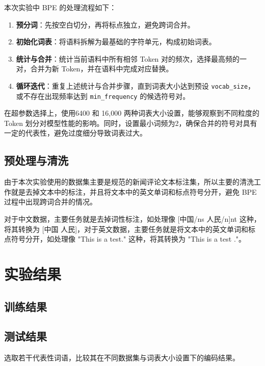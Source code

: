 \documentclass[a4paper,12pt]{ctexart} %
\begin{document}
本次实验中 BPE 的处理流程如下：
\begin{enumerate}
    \item \textbf{预分词}：先按空白切分，再将标点独立，避免跨词合并。
    \item \textbf{初始化词表}：将语料拆解为最基础的字符单元，构成初始词表。
    \item \textbf{统计与合并}：统计当前语料中所有相邻 Token 对的频次，选择最高频的一对，合并为新 Token，并在语料中完成对应替换。
    \item \textbf{循环迭代}：重复上述统计与合并步骤，直到词表大小达到预设 \texttt{vocab\_size}，或不存在出现频率达到 \texttt{min\_frequency} 的候选符号对。
\end{enumerate}
在超参数选择上，使用6400 和 16,000 两种词表大小设置，能够观察到不同粒度的 Token 划分对模型性能的影响。同时，设置最小词频为2，确保合并的符号对具有一定的代表性，避免过度细分导致词表过大。
\subsection{预处理与清洗}
由于本次实验使用的数据集主要是规范的新闻评论文本标注集，所以主要的清洗工作就是去掉文本中的标注，并且将文本中的英文单词和标点符号分开，避免 BPE 过程中出现跨词合并的情况。


对于中文数据，主要任务就是去掉词性标注，如处理像 [中国/ns 人民/n]nt 这种，将其转换为 [中国 人民]，对于英文数据，主要任务就是将文本中的英文单词和标点符号分开，如处理像 "This is a test." 这种，将其转换为 "This is a test ."。

\section{实验结果}


\subsection{训练结果}


\subsection{测试结果}

选取若干代表性词语，比较其在不同数据集与词表大小设置下的编码结果。
\end{document}
